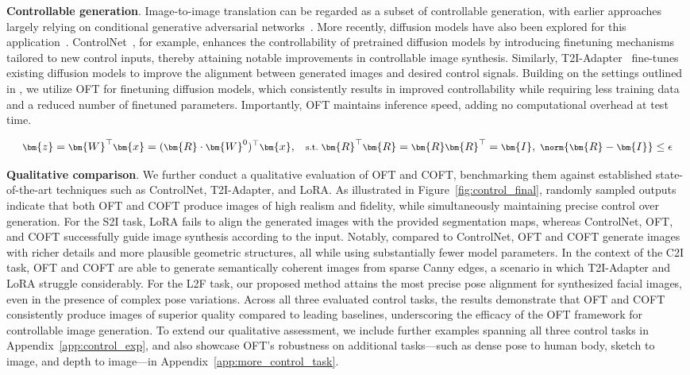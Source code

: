 \textbf{Controllable generation}. Image-to-image translation can be regarded as a subset of controllable generation, with earlier approaches largely relying on conditional generative adversarial networks~\cite{isola2017image,zhu2017toward,wang2018high,park2019semantic,choi2018stargan}. More recently, diffusion models have also been explored for this application~\cite{saharia2022palette,voynov2022sketch,wang2022pretraining}. ControlNet~\cite{zhang2023adding}, for example, enhances the controllability of pretrained diffusion models by introducing finetuning mechanisms tailored to new control inputs, thereby attaining notable improvements in controllable image synthesis. Similarly, T2I-Adapter~\cite{mou2023t2i} fine-tunes existing diffusion models to improve the alignment between generated images and desired control signals. Building on the settings outlined in \cite{zhang2023adding,mou2023t2i}, we utilize OFT for finetuning diffusion models, which consistently results in improved controllability while requiring less training data and a reduced number of finetuned parameters. Importantly, OFT maintains inference speed, adding no computational overhead at test time.

\begin{equation}\label{eq:coft_general}
    \footnotesize
    \bm{z}=\bm{W}^\top\bm{x}=(\bm{R}\cdot\bm{W}^0)^\top\bm{x},~~~\text{s.t.}~\bm{R}^\top\bm{R}=\bm{R}\bm{R}^\top=\bm{I},~\norm{\bm{R}-\bm{I}}\leq \epsilon
\end{equation}

\textbf{Qualitative comparison}. We further conduct a qualitative evaluation of OFT and COFT, benchmarking them against established state-of-the-art techniques such as ControlNet, T2I-Adapter, and LoRA. As illustrated in Figure~\ref{fig:control_final}, randomly sampled outputs indicate that both OFT and COFT produce images of high realism and fidelity, while simultaneously maintaining precise control over generation. For the S2I task, LoRA fails to align the generated images with the provided segmentation maps, whereas ControlNet, OFT, and COFT successfully guide image synthesis according to the input. Notably, compared to ControlNet, OFT and COFT generate images with richer details and more plausible geometric structures, all while using substantially fewer model parameters. In the context of the C2I task, OFT and COFT are able to generate semantically coherent images from sparse Canny edges, a scenario in which T2I-Adapter and LoRA struggle considerably. For the L2F task, our proposed method attains the most precise pose alignment for synthesized facial images, even in the presence of complex pose variations. Across all three evaluated control tasks, the results demonstrate that OFT and COFT consistently produce images of superior quality compared to leading baselines, underscoring the efficacy of the OFT framework for controllable image generation. To extend our qualitative assessment, we include further examples spanning all three control tasks in Appendix~\ref{app:control_exp}, and also showcase OFT's robustness on additional tasks—such as dense pose to human body, sketch to image, and depth to image—in Appendix~\ref{app:more_control_task}.

